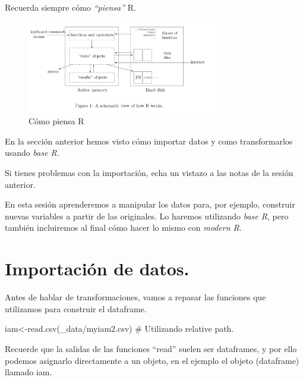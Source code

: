 \documentclass[
  letterpaper,
  DIV=11,
  numbers=noendperiod]{scrreprt}
\newenvironment{Shaded}{\begin{snugshade}}{\end{snugshade}}
\newcommand{\CommentTok}[1]{\textcolor[rgb]{0.37,0.37,0.37}{#1}}
\newcommand{\FunctionTok}[1]{\textcolor[rgb]{0.28,0.35,0.67}{#1}}
\newcommand{\NormalTok}[1]{\textcolor[rgb]{0.00,0.23,0.31}{#1}}
\newcommand{\OtherTok}[1]{\textcolor[rgb]{0.00,0.23,0.31}{#1}}
\newcommand{\StringTok}[1]{\textcolor[rgb]{0.13,0.47,0.30}{#1}}
\begin{document}
Recuerda siempre cómo \emph{``piensa''} R.

\begin{figure}

{\centering \includegraphics[width=0.75\textwidth,height=\textheight]{./pics/como_piensa_R.png}

}

\caption{Cómo piensa R}

\end{figure}

En la sección anterior hemos visto cómo importar datos y como
transformarlos usando \emph{base R}.

Si tienes problemas con la importación, echa un vistazo a las notas de
la sesión anterior.

En esta sesión aprenderemos a manipular los datos para, por ejemplo,
construir nuevas variables a partir de las originales. Lo haremos
utilizando \emph{base R}, pero también incluiremos al final cómo hacer
lo mismo con \emph{modern R}.

\hypertarget{importaciuxf3n-de-datos.}{%
\section{Importación de datos.}\label{importaciuxf3n-de-datos.}}

Antes de hablar de transformaciones, vamos a repasar las funciones que
utilizamos para construir el dataframe.

\begin{Shaded}
\begin{Highlighting}[]
\NormalTok{iam}\OtherTok{\textless{}{-}}\FunctionTok{read.csv}\NormalTok{(}\StringTok{\textquotesingle{}\_data/myiam2.csv\textquotesingle{}}\NormalTok{) }\CommentTok{\# Utilizando relative path.}
\end{Highlighting}
\end{Shaded}

Recuerde que la salidas de las funciones ``read'' suelen ser dataframes,
y por ello podemos asignarlo directamente a un objeto, en el ejemplo el
objeto (dataframe) llamado iam.
\end{document}
